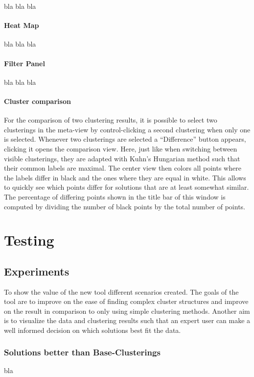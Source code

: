 \documentclass[
	a4paper,
	english,
	twoside,
	openright,               
	11pt                            
	]{report}
\begin{document}
bla bla bla

\subsection{Heat Map}

bla bla bla

\subsection{Filter Panel}

bla bla bla

\subsection{Cluster comparison}

For the comparison of two clustering results, it is possible to select two clusterings in the meta-view by control-clicking a second clustering when only one is selected. Whenever two clusterings are selected a ``Difference'' button appears, clicking it opens the comparison view. Here, just like when switching between visible clusterings, they are adapted with Kuhn’s Hungarian method \cite{Kuhn2010} such that their common labels are maximal. The center view then colors all points where the labels differ in black and the ones where they are equal in white. This allows to quickly see which points differ for solutions that are at least somewhat similar. The percentage of differing points shown in the title bar of this window is computed by dividing the number of black points by the total number of points.

\part{Testing}
\chapter{Experiments}\label{cha:experiments}
To show the value of the new tool different scenarios created. The goals of the tool are to improve on the ease of finding complex cluster structures and improve on the result in comparison to only using simple clustering methods. Another aim is to visualize the data and clustering results such that an expert user can make a well informed decision on which solutions best fit the data.
\section{Solutions better than Base-Clusterings}
bla
\end{document}

